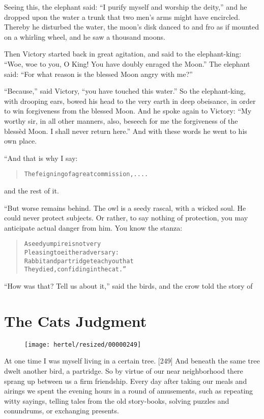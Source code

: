 \documentclass[article, twoside, 10pt]{memoir}
\renewenvironment{verbatim}{%
\begin{quote}%
\vskip -10pt%
\begin{alltt}\normalfont\small}{\end{alltt}%
\end{quote}%
\vskip -10pt
} %
\begin{document}
Seeing this, the elephant said:
``I purify myself and worship the deity,'' and he dropped upon the
water a trunk that two men's arms might have encircled. Thereby he
disturbed the water, the moon's disk danced to and fro as if
mounted on a whirling wheel, and he saw a thousand moons.

Then Victory started back in great agitation, and said to the
elephant-king:
``Woe, woe to you, O King! You have doubly enraged the Moon.'' The
elephant said:
``For what reason is the blessed Moon angry with me?''

``Because,'' said Victory, ``you have touched this water.'' So the
elephant-king, with drooping ears, bowed his head to the very earth
in deep obeisance, in order to win forgiveness from the blessed
Moon. And he spoke again to Victory:
``My worthy sir, in all other manners, also, beseech for me the forgiveness of the blessèd Moon. I shall never return here.''
And with these words he went to his own place.

“And that is why I say:

\begin{verbatim}
The feigning of a great commission,....
\end{verbatim}
and the rest of it.

“But worse remains behind. The owl is a seedy rascal, with a wicked
soul. He could never protect subjects. Or rather, to say nothing of
protection, you may anticipate actual danger from him. You know the
stanza:

\begin{verbatim}
A seedy umpire is not very
Pleasing to either adversary:
Rabbit and partridge teach you that{\textemdash}
They died, confiding in the cat.”
\end{verbatim}
``How was that? Tell us about it,'' said the birds, and the crow
told the story of

\chapter{The Cats Judgment}

\begin{figure}[p]\texttt{[image: hertel/resized/00000249]}\end{figure}At one time I was myself living in a certain tree. [249] And
beneath the same tree dwelt another bird, a partridge. So by virtue
of our near neighborhood there sprang up between us a firm
friendship. Every day after taking our meals and airings we spent
the evening hours in a round of amusements, such as repeating witty
sayings, telling tales from the old story-books, solving puzzles
and conundrums, or exchanging presents.
\end{document}
